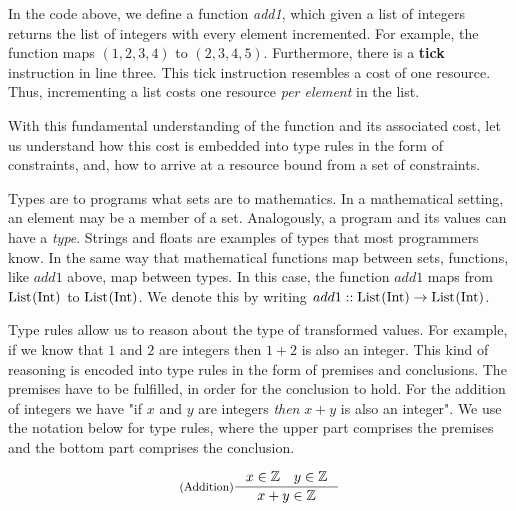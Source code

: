 In the code above, we define a function \emph{add1}, which given a list of integers returns the list of integers with every element incremented. For example, the function maps \((1, 2, 3, 4)\) to \((2, 3, 4, 5)\). Furthermore, there is a \textbf{tick} instruction in line three. This tick instruction resembles a cost of one resource. Thus, incrementing a list costs one resource \emph{per element} in the list.

With this fundamental understanding of the function and its associated cost, let us understand how this cost is embedded into type rules in the form of constraints, and, how to arrive at a resource bound from a set of constraints. 

Types are to programs what sets are to mathematics. In a mathematical setting, an element may be a member of a set. Analogously, a program and its values can have a \emph{type}. Strings and floats are examples of types that most programmers know. In the same way that mathematical functions map between sets, functions, like \(add1\) above, map between types. In this case, the function \(add1\) maps from \(\text{List}^{}(\text{Int})\) to \(\text{List}^{}(\text{Int})\). We denote this by writing \(add1 :: \text{List}^{}(\text{Int}) \to \text{List}^{}(\text{Int})\).

Type rules allow us to reason about the type of transformed values. For example, if we know that \(1\) and \(2\) are integers then \(1 + 2\) is also an integer. This kind of reasoning is encoded into type rules in the form of premises and conclusions. The premises have to be fulfilled, in order for the conclusion to hold. For the addition of integers we have "if \(x\) and \(y\) are integers \emph{then} \(x + y\) is also an integer". We use the notation below for type rules, where the upper part comprises the premises and the bottom part comprises the conclusion.

\[
   \inference[(Addition)]
   {x \in \mathbb{Z} \quad y \in \mathbb{Z}}
   {x + y \in \mathbb{Z}}
\]
